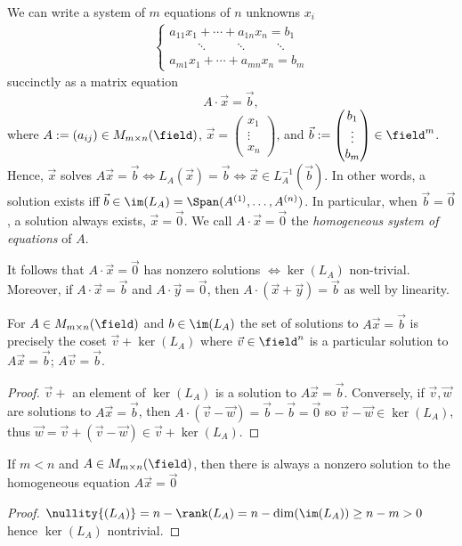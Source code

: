 We can write a system of $m$ equations of $n$ unknowns $x_i$
\begin{align*}
    \begin{cases}
        a_{11}x_1 + \cdots + a_{1n}x_n = b_1\\
        \qquad \ddots \qquad \ddots \qquad \ddots \\
        a_{m1}x_1 + \cdots + a_{mn}x_n = b_m
    \end{cases}
\end{align*}
succinctly as a matrix equation \[
A \cdot \vec{x} = \vec{b},    
\]
where $A := (a_{ij}) \in M_{m \times n}(\field)$, $\vec{x} = \begin{pmatrix}
    x_1\\
    \vdots\\
    x_n
\end{pmatrix}$, and $\vec{b} := \begin{pmatrix}
    b_1\\
    \vdots\\
    b_m
\end{pmatrix} \in \field^m$. Hence, $\vec{x}$ solves $A \vec{x} = \vec{b} \iff L_{A}(\vec{x}) = \vec{b} \iff \vec{x} \in L_{A}^{-1}(\vec{b})$. In other words, a solution exists iff $\vec{b} \in \im(L_A) = \Span(A^{(1)}, \dots, A^{(n)})$. In particular, when $\vec{b} = \vec{0}$, a solution always exists, $\vec{x} = \vec{0}$. We call $A \cdot \vec{x} = \vec{0}$ the \emph{homogeneous system of equations} of $A$. 

It follows that $A \cdot \vec{x} = \vec{0}$ has nonzero solutions $\iff \ker(L_A)$ non-trivial. Moreover, if $A \cdot \vec{x} = \vec{b}$ and $A \cdot \vec{y} = \vec{0}$, then $A\cdot (\vec{x} + \vec{y}) = \vec{b}$ as well by linearity.

\begin{proposition}
    For $A \in M_{m \times n}(\field)$ and $b \in \im(L_A)$ the set of solutions to $A\vec{x} = \vec{b}$ is precisely the coset $\vec{v} + \ker(L_A)$ where $\vec{v} \in \field^n$ is a particular solution to $A \vec{x} = \vec{b}$; $A \vec{v} = \vec{b}$.
\end{proposition}

\begin{proof}
    $\vec{v} + $ an element of $\ker(L_A)$ is a solution to $A \vec{x} = \vec{b}$. Conversely, if $\vec{v}, \vec{w}$ are solutions to $A \vec{x} = \vec{b}$, then $A \cdot (\vec{v} - \vec{w}) = \vec{b} - \vec{b} = \vec{0}$ so $\vec{v} - \vec{w} \in \ker(L_A)$, thus $\vec{w} = \vec{v} + (\vec{v} - \vec{w}) \in \vec{v} + \ker(L_{A})$.
\end{proof}

\begin{corollary}
    If $m < n$ and $A \in M_{m \times n}(\field)$, then there is always a nonzero solution to the homogeneous equation $A \vec{x} = \vec{0}$
\end{corollary}

\begin{proof}
    $\nullity{(L_A)} = n - \rank(L_A) = n - \dim(\im(L_A)) \geq n - m > 0$ hence $\ker(L_A)$ nontrivial.
\end{proof}